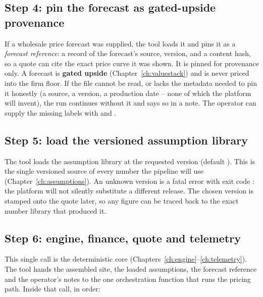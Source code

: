 \subsection{Step 4: pin the forecast as gated-upside provenance}

If a wholesale price forecast was supplied, the tool loads it and pins it as a \emph{forecast reference}: a record of the forecast's source, version, and a content hash, so a quote can cite the exact price curve it was shown. It is pinned for provenance only. A forecast is \textbf{gated upside} (Chapter~\ref{ch:valuestack}) and is never priced into the firm floor. If the file cannot be read, or lacks the metadata needed to pin it honestly (a source, a version, a production date -- none of which the platform will invent), the run continues without it and says so in a note. The operator can supply the missing labels with  and .

\subsection{Step 5: load the versioned assumption library}

The tool loads the assumption library at the requested version (default ). This is the single versioned source of every number the pipeline will use (Chapter~\ref{ch:assumptions}). An unknown version is a fatal error with exit code : the platform will not silently substitute a different release. The chosen version is stamped onto the quote later, so any figure can be traced back to the exact number library that produced it.

\subsection{Step 6: engine, finance, quote and telemetry}

This single call is the deterministic core (Chapters~\ref{ch:engine}--\ref{ch:telemetry}). The tool hands the assembled site, the loaded assumptions, the forecast reference and the operator's notes to the one orchestration function that runs the pricing path. Inside that call, in order:

